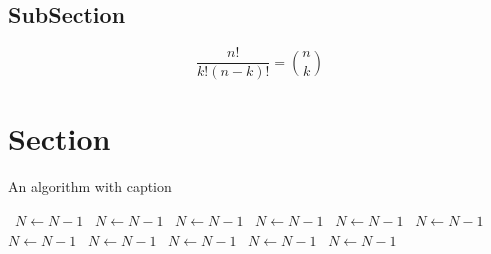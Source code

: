 \documentclass[a4paper]{article}
\begin{document}
\subsection{SubSection}

\[ \frac{n!}{k!(n-k)!} = \binom{n}{k} \]

\section{Section}

\begin{algorithm}
\caption{An algorithm with caption}
\begin{algorithmic}
\    \State $N \gets N - 1$
\    \State $N \gets N - 1$
\    \State $N \gets N - 1$
\    \State $N \gets N - 1$
\    \State $N \gets N - 1$
\    \State $N \gets N - 1$
\    \State $N \gets N - 1$
\    \State $N \gets N - 1$
\    \State $N \gets N - 1$
\    \State $N \gets N - 1$
\    \State $N \gets N - 1$
\EndWhile
\end{algorithmic}
\end{algorithm}
\end{document}
